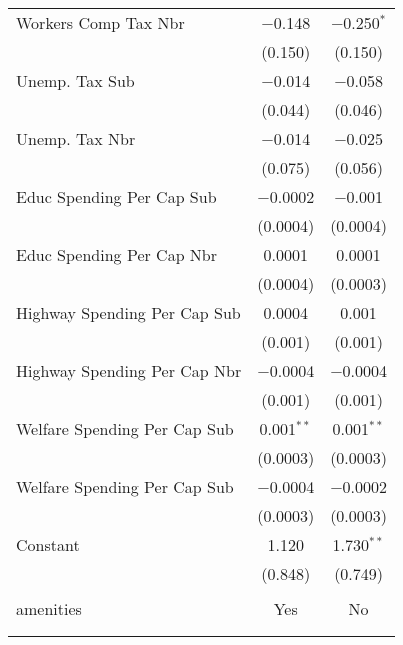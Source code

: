 \begin{table}[!htbp]
\begin{tabular}{@{\extracolsep{5pt}}lcc}
  Workers Comp Tax Nbr & $-$0.148 & $-$0.250$^{*}$ \\ 
  & (0.150) & (0.150) \\ 
  Unemp. Tax Sub & $-$0.014 & $-$0.058 \\ 
  & (0.044) & (0.046) \\ 
  Unemp. Tax Nbr & $-$0.014 & $-$0.025 \\ 
  & (0.075) & (0.056) \\ 
  Educ Spending Per Cap Sub & $-$0.0002 & $-$0.001 \\ 
  & (0.0004) & (0.0004) \\ 
  Educ Spending Per Cap Nbr & 0.0001 & 0.0001 \\ 
  & (0.0004) & (0.0003) \\ 
  Highway Spending Per Cap Sub & 0.0004 & 0.001 \\ 
  & (0.001) & (0.001) \\ 
  Highway Spending Per Cap Nbr & $-$0.0004 & $-$0.0004 \\ 
  & (0.001) & (0.001) \\ 
  Welfare Spending Per Cap Sub & 0.001$^{**}$ & 0.001$^{**}$ \\ 
  & (0.0003) & (0.0003) \\ 
  Welfare Spending Per Cap Sub & $-$0.0004 & $-$0.0002 \\ 
  & (0.0003) & (0.0003) \\ 
  Constant & 1.120 & 1.730$^{**}$ \\ 
  & (0.848) & (0.749) \\ 
 \hline \\[-1.8ex] 
amenities & Yes & No \\ 
\hline \\[-1.8ex] 
\hline 
\hline \\[-1.8ex] 
\end{tabular} 
\end{table} 
